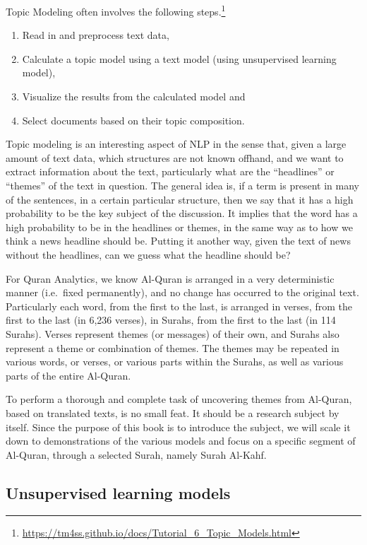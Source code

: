\documentclass[
]{article}
\providecommand{\tightlist}{%
  \setlength{\itemsep}{0pt}\setlength{\parskip}{0pt}}
\begin{document}
Topic Modeling often involves the following steps.\footnote{\url{https://tm4ss.github.io/docs/Tutorial_6_Topic_Models.html}}

\begin{enumerate}
\def\labelenumi{\arabic{enumi}.}
\tightlist
\item
  Read in and preprocess text data,
\item
  Calculate a topic model using a text model (using unsupervised learning model),
\item
  Visualize the results from the calculated model and
\item
  Select documents based on their topic composition.
\end{enumerate}

Topic modeling is an interesting aspect of NLP in the sense that, given a large amount of text data, which structures are not known offhand, and we want to extract information about the text, particularly what are the ``headlines'' or ``themes'' of the text in question. The general idea is, if a term is present in many of the sentences, in a certain particular structure, then we say that it has a high probability to be the key subject of the discussion. It implies that the word has a high probability to be in the headlines or themes, in the same way as to how we think a news headline should be. Putting it another way, given the text of news without the headlines, can we guess what the headline should be?

For Quran Analytics, we know Al-Quran is arranged in a very deterministic manner (i.e.~fixed permanently), and no change has occurred to the original text. Particularly each word, from the first to the last, is arranged in verses, from the first to the last (in 6,236 verses), in Surahs, from the first to the last (in 114 Surahs). Verses represent themes (or messages) of their own, and Surahs also represent a theme or combination of themes. The themes may be repeated in various words, or verses, or various parts within the Surahs, as well as various parts of the entire Al-Quran.

To perform a thorough and complete task of uncovering themes from Al-Quran, based on translated texts, is no small feat. It should be a research subject by itself. Since the purpose of this book is to introduce the subject, we will scale it down to demonstrations of the various models and focus on a specific segment of Al-Quran, through a selected Surah, namely Surah Al-Kahf.

\hypertarget{unsupervised-learning-models}{%
\subsection{Unsupervised learning models}\label{unsupervised-learning-models}}
\end{document}
